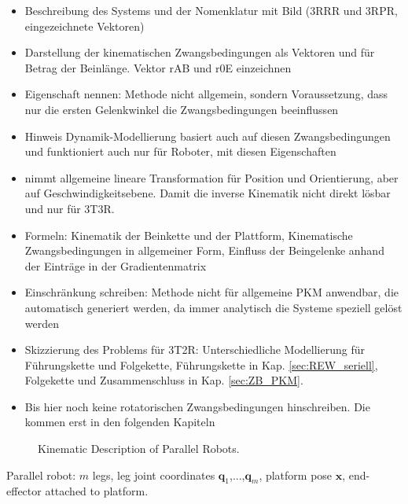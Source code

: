 \documentclass[robotics,article,submit,moreauthors,pdftex]{Definitions/mdpi}
\newcommand{\bm}[1]{\boldsymbol{#1}}
\begin{document}
\begin{itemize}
    \item Beschreibung des Systems und der Nomenklatur mit Bild (3RRR und 3RPR, eingezeichnete Vektoren)
    \item Darstellung der kinematischen Zwangsbedingungen als Vektoren und für Betrag der Beinlänge. Vektor rAB und r0E einzeichnen
    \item Eigenschaft nennen: Methode nicht allgemein, sondern Voraussetzung, dass nur die ersten Gelenkwinkel die Zwangsbedingungen beeinflussen
    \item Hinweis Dynamik-Modellierung basiert auch auf diesen Zwangsbedingungen \cite{Merlet2006,BriotKha2015,AbdellatifHei2009,DoThanhKotHeiOrt2009b} und funktioniert auch nur für Roboter, mit diesen Eigenschaften
    \item \cite{Gogu2008} nimmt allgemeine lineare Transformation für Position und Orientierung, aber auf Geschwindigkeitsebene. Damit die inverse Kinematik nicht direkt lösbar und nur für 3T3R.
    \item Formeln: Kinematik der Beinkette und der Plattform, Kinematische Zwangsbedingungen in allgemeiner Form, Einfluss der Beingelenke anhand der Einträge in der Gradientenmatrix
    \item Einschränkung schreiben: Methode nicht für allgemeine PKM anwendbar, die automatisch generiert werden, da immer analytisch die Systeme speziell gelöst werden
    \item Skizzierung des Problems für 3T2R: Unterschiedliche Modellierung für Führungskette und Folgekette, Führungskette in Kap. \ref{sec:REW_seriell}, Folgekette und Zusammenschluss in Kap. \ref{sec:ZB_PKM}.
    \item Bis hier noch keine rotatorischen Zwangsbedingungen hinschreiben. Die kommen erst in den folgenden Kapiteln
\end{itemize}

\begin{figure}[tb]
    
    \caption{Kinematic Description of Parallel Robots.}
    \label{fig:pkm_constr_transl}
\end{figure} 

Parallel robot: $m$ legs, leg joint coordinates $\bm{q}_1$,...,$\bm{q}_m$, platform pose $\bm{x}$, end-effector attached to platform.
\end{document}
